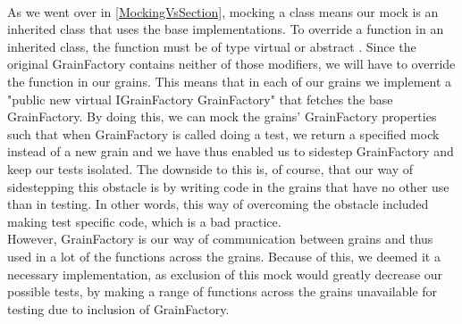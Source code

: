 \\
As we went over in \autoref{MockingVsSection}, mocking a class means our mock is an inherited class that uses the base implementations. To override a function in an inherited class, the function must be of type virtual or abstract . Since the original GrainFactory contains neither of those modifiers, we will have to override the function in our grains. This means that in each of our grains we implement a "public new virtual IGrainFactory GrainFactory" that fetches the base GrainFactory. By doing this, we can mock the grains' GrainFactory properties such that when GrainFactory is called doing a test, we return a specified mock instead of a new grain and we have thus enabled us to sidestep GrainFactory and keep our tests isolated. The downside to this is, of course, that our way of sidestepping this obstacle is by writing code in the grains that have no other use than in testing. In other words, this way of overcoming the obstacle included making test specific code, which is a bad practice. \\
However, GrainFactory is our way of communication between grains and thus used in a lot of the functions across the grains. Because of this, we deemed it a necessary implementation, as exclusion of this mock would greatly decrease our possible tests, by making a range of functions across the grains unavailable for testing due to inclusion of GrainFactory.
